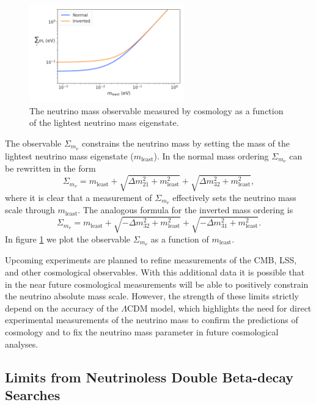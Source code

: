 \begin{figure}[htbp]
    \centering
    \includegraphics[width=0.6\textwidth]{figs/Chapter-2/230301_cosmology_nu_mass_observable.png}
    \caption{The neutrino mass observable measured by cosmology as a function of the lightest neutrino mass eigenstate.}
    \label{fig:chap2-nu-mass-cosmo}
\end{figure}

The observable $\Sigma_{m_\nu}$ constrains the neutrino mass by setting the mass of the lightest neutrino mass eigenstate ($m_\mathrm{least}$). In the normal mass ordering $\Sigma_{m_\nu}$ can be rewritten in the form 
\begin{equation}
    \Sigma_{m_\nu} = m_\mathrm{least} + \sqrt{\Delta m_{21}^2+m_\mathrm{least}^2}+\sqrt{\Delta m_{32}^2+m_\mathrm{least}^2},
\end{equation}
where it is clear that a measurement of $\Sigma_{m_\nu}$ effectively sets the neutrino mass scale through $m_\mathrm{least}$. The analogous formula for the inverted mass ordering is 
\begin{equation}
    \Sigma_{m_\nu} = m_\mathrm{least}+\sqrt{-\Delta m_{32}^2+m_\mathrm{least}^2}+\sqrt{-\Delta m_{31}^2+m_\mathrm{least}^2}.
\end{equation}
In figure \ref{fig:chap2-nu-mass-cosmo} we plot the observable $\Sigma_{m_\nu}$ as a function of $m_\mathrm{least}$.

Upcoming experiments are planned to refine measurements of the CMB, LSS, and other cosmological observables. With this additional data it is possible that in the near future cosmological measurements will be able to positively constrain the neutrino absolute mass scale. However, the strength of these limits strictly depend on the accuracy of the $\Lambda$CDM model, which highlights the need for direct experimental measurements of the neutrino mass to confirm the predictions of cosmology and to fix the neutrino mass parameter in future cosmological analyses.

\subsection{Limits from Neutrinoless Double Beta-decay Searches}


